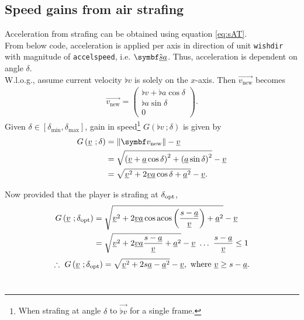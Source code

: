 \subsection{Speed gains from air strafing}
\label{sec:speed_gains}
Acceleration from strafing can be obtained using equation \eqref{eq:sAT}.\\
From below code, acceleration is applied per axis in direction of unit \texttt{wishdir} with magnitude of \texttt{accelspeed}, i.e. $\uvec{\flat{s}}\flat{a}$.
Thus, acceleration is dependent on angle $\delta$.\\
W.l.o.g., assume current velocity $\flat{v}$ is solely on the $x$-axis. Then $\vec{v_\text{new}}$ becomes
\begin{align*}
\vec{v_\text{new}} =
\begin{pmatrix}
\flat{v} + \flat{a}\cos\delta\\\flat{a}\sin\delta\\0
\end{pmatrix}.
\end{align*}
Given $\delta \in [\delta_{\min}, \delta_{\max}]$, gain in speed\footnote{When strafing at angle $\delta$ to $\vec{\flat{v}}$ for a single frame.} $G\left(\flat{v}\ ;\delta \right)$ is given by
\begin{align*}
G\left(\flat{v}\ ;\delta \right) &= \norm{\vec{v_\text{new}}} - \flat{v}\\
&= \sqrt{\left(\flat{v} + \flat{a}\cos\delta \right)^2 + \left(\flat{a}\sin\delta \right)^2} - \flat{v}\\
&= \sqrt{\flat{v}^2 + 2\flat{v}\flat{a}\cos\delta + \flat{a}^2} - \flat{v}.
\end{align*}

Now provided that the player is strafing at $\delta_{\operatorname{opt}}$,
\begin{align*}
G\left(\flat{v}\ ;\delta_{\opt} \right) &= \sqrt{\flat{v}^2 + 2\flat{v}\flat{a}\cos{\acos\left( \frac{s - \flat{a}}{\flat{v}} \right)} + \flat{a}^2} - \flat{v}\\
&= \sqrt{\flat{v}^2 + 2\flat{v}\flat{a}\frac{s - \flat{a}}{\flat{v}} + \flat{a}^2} - \flat{v}\ \ldots\ \frac{s - \flat{a}}{\flat{v}} \leq 1
\end{align*}
\begin{align}
\label{eq:speed_gain}
\therefore\ G\left(\flat{v}\ ;\delta_{\opt} \right) = \sqrt{\flat{v}^2 + 2s\flat{a} - \flat{a}^2} - \flat{v},\ \text{where}\ \flat{v}\geq s - \flat{a}.
\end{align}\\


